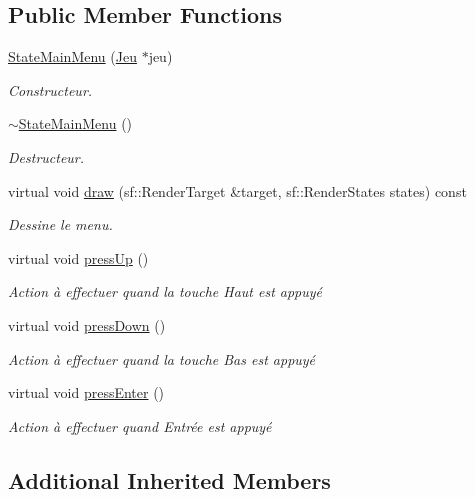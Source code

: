 \subsection*{Public Member Functions}
\begin{DoxyCompactItemize}
\item 
\hyperlink{class_state_main_menu_ad1dfd37dfda1c880599b8a51be5f55cd}{State\+Main\+Menu} (\hyperlink{class_jeu}{Jeu} $\ast$jeu)
\begin{DoxyCompactList}\small\item\em Constructeur. \end{DoxyCompactList}\item 
\hyperlink{class_state_main_menu_aae1ad451be64082e6e8f021d72d2050c}{$\sim$\+State\+Main\+Menu} ()
\begin{DoxyCompactList}\small\item\em Destructeur. \end{DoxyCompactList}\item 
virtual void \hyperlink{class_state_main_menu_ae372daf9ed9b53da4c23c01d4a7787a4}{draw} (sf\+::\+Render\+Target \&target, sf\+::\+Render\+States states) const 
\begin{DoxyCompactList}\small\item\em Dessine le menu. \end{DoxyCompactList}\item 
virtual void \hyperlink{class_state_main_menu_a714cb2def73b1146ad862e667b6996ee}{press\+Up} ()
\begin{DoxyCompactList}\small\item\em Action à effectuer quand la touche Haut est appuyé \end{DoxyCompactList}\item 
virtual void \hyperlink{class_state_main_menu_a90c547b9d2aae731a752c71fb7c0ab4a}{press\+Down} ()
\begin{DoxyCompactList}\small\item\em Action à effectuer quand la touche Bas est appuyé \end{DoxyCompactList}\item 
virtual void \hyperlink{class_state_main_menu_a25dac2e7223f8f36a9e4f372bb25b702}{press\+Enter} ()
\begin{DoxyCompactList}\small\item\em Action à effectuer quand Entrée est appuyé \end{DoxyCompactList}\end{DoxyCompactItemize}
\subsection*{Additional Inherited Members}


